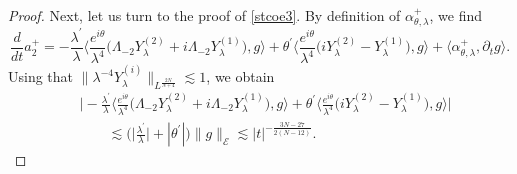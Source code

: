 \documentclass[a4paper,two-side,10pt]{amsart}
\numberwithin{equation}{section}
\begin{document}
\begin{proof}
Next, let us turn to the proof of \eqref{stcoe3}. By definition of $\alpha_{\theta,\lambda}^+$, we find 
$$\frac{d}{dt} a_2^+ = -\frac{\lambda^\prime}{\lambda} \Big\langle \frac{e^{i\theta}}{\lambda^4} \big(\Lambda_{-2} Y^{(2)}_\lambda +i \Lambda_{-2} Y_\lambda^{(1)}\big),g \Big\rangle +\theta^\prime \Big\langle \frac{e^{i\theta}}{\lambda^4} \big(iY_\lambda^{(2)} - Y_\lambda^{(1)} \big) ,g  \Big\rangle + \langle \alpha_{\theta ,\lambda}^+ , \partial_t g \rangle .$$
Using that $\|\lambda^{-4}Y_\lambda^{(i)}\|_{L^{\frac{2N}{N+4}}}\lesssim 1$, we obtain
\begin{align}\label{2ndfirst3}
&\Big| -\frac{\lambda^\prime}{\lambda} \Big\langle \frac{e^{i\theta}}{\lambda^4} \big(\Lambda_{-2} Y^{(2)}_\lambda +i \Lambda_{-2} Y_\lambda^{(1)}\big),g \Big\rangle +\theta^\prime \Big\langle \frac{e^{i\theta}}{\lambda^4} \big(iY_\lambda^{(2)} - Y_\lambda^{(1)} \big) ,g  \Big\rangle \Big|\nonumber\\ 
&\qquad\lesssim  \Big(\Big|\frac{\lambda^\prime}{\lambda}\Big| + |\theta^\prime|\Big) \|g\|_{\mathcal{E}}\lesssim  |t|^{-\frac{3N-27}{2(N-12)}}.
\end{align}


\end{proof}
\end{document}
